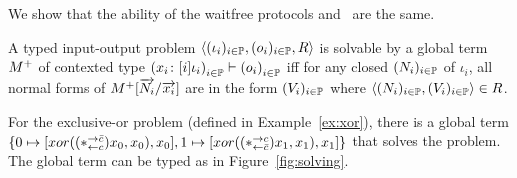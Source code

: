 {We show that the ability of the waitfree protocols and \lgd\, are the same.
\begin{definition}
 \label{def:solvable}
 A typed input-output problem
 $\langle{(\iota_i)_{i\in \mathbb{P}}, (o_i)_{i\in \mathbb{P}}, R}\rangle$ is
 solvable by a global term
 ${M}^+$ of contexted type
 $\left({x_i} \colon{[i]\iota_i}\right)_{i\in\mathbb{P}}
 \vdash\left(o_i\right)_{i\in \mathbb{P}}$ iff
 for any closed $(N_i)_{i\in \mathbb{P}}$ of $\iota_i$,
 all normal forms of ${M}^+[\overrightarrow{N_i}/\overrightarrow{x_i}]$
 are in the form $(V_i)_{i\in\mathbb{P}}$
 where $\langle{(N_i)_{i\in \mathbb{P}}, (V_i)_{i\in \mathbb{P}}}\rangle\in R$.
\end{definition}

 \begin{example}
  For the exclusive-or problem (defined in Example~\ref{ex:xor}), there is
  a global term $\{0\mapsto [{xor((\ast^{\rightarrow {\bar{c}}}_{\leftarrow{c}})x_0,x_0),x_0}],
  1\mapsto[{xor((\ast^{\rightarrow {c}}_{\leftarrow{\bar{c}}})x_1,x_1),x_1}]\}$ that solves the
  problem.
  The global term can be typed as in Figure~\ref{fig:solving}.
 \end{example}

}
